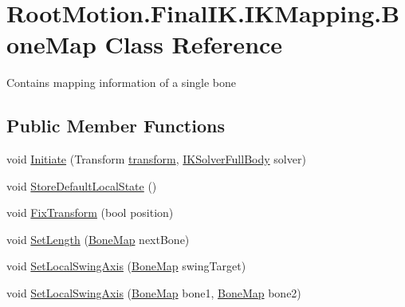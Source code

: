 \hypertarget{class_root_motion_1_1_final_i_k_1_1_i_k_mapping_1_1_bone_map}{}\section{Root\+Motion.\+Final\+I\+K.\+I\+K\+Mapping.\+Bone\+Map Class Reference}
\label{class_root_motion_1_1_final_i_k_1_1_i_k_mapping_1_1_bone_map}


Contains mapping information of a single bone  


\subsection*{Public Member Functions}
\begin{DoxyCompactItemize}
\item 
void \mbox{\hyperlink{class_root_motion_1_1_final_i_k_1_1_i_k_mapping_1_1_bone_map_a452381f07cc197ea9520b93976a35d51}{Initiate}} (Transform \mbox{\hyperlink{class_root_motion_1_1_final_i_k_1_1_i_k_mapping_1_1_bone_map_a6e6e445ada57edda918a157d6c5b3f4f}{transform}}, \mbox{\hyperlink{class_root_motion_1_1_final_i_k_1_1_i_k_solver_full_body}{I\+K\+Solver\+Full\+Body}} solver)
\item 
void \mbox{\hyperlink{class_root_motion_1_1_final_i_k_1_1_i_k_mapping_1_1_bone_map_abab5742efca16b3906a4ae01e115269f}{Store\+Default\+Local\+State}} ()
\item 
void \mbox{\hyperlink{class_root_motion_1_1_final_i_k_1_1_i_k_mapping_1_1_bone_map_ad5be0488c306e9a4286a3416b5de5600}{Fix\+Transform}} (bool position)
\item 
void \mbox{\hyperlink{class_root_motion_1_1_final_i_k_1_1_i_k_mapping_1_1_bone_map_a8b189ab5c06e8092ed20e4a8aea5b8d0}{Set\+Length}} (\mbox{\hyperlink{class_root_motion_1_1_final_i_k_1_1_i_k_mapping_1_1_bone_map}{Bone\+Map}} next\+Bone)
\item 
void \mbox{\hyperlink{class_root_motion_1_1_final_i_k_1_1_i_k_mapping_1_1_bone_map_a6a9c1721b59abdc55d45755a267981bb}{Set\+Local\+Swing\+Axis}} (\mbox{\hyperlink{class_root_motion_1_1_final_i_k_1_1_i_k_mapping_1_1_bone_map}{Bone\+Map}} swing\+Target)
\item 
void \mbox{\hyperlink{class_root_motion_1_1_final_i_k_1_1_i_k_mapping_1_1_bone_map_a068e6ae1e59ebe6c0a0794f51f5d2840}{Set\+Local\+Swing\+Axis}} (\mbox{\hyperlink{class_root_motion_1_1_final_i_k_1_1_i_k_mapping_1_1_bone_map}{Bone\+Map}} bone1, \mbox{\hyperlink{class_root_motion_1_1_final_i_k_1_1_i_k_mapping_1_1_bone_map}{Bone\+Map}} bone2)

\end{DoxyCompactItemize}
